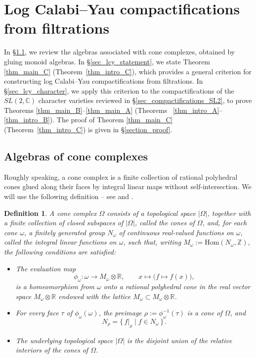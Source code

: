 \documentclass[12pt,letterpaper, reqno]{amsart}
\theoremstyle{defstyle} \newtheorem{definition}[theorem]{Definition}
\theoremstyle{remark}
\numberwithin{equation}{section}
\numberwithin{figure}{section}
\newcommand{\CC} {\mathbb{C}}
\newcommand{\Hom} {\mathrm{Hom}}
\newcommand{\RR} {\mathbb{R}}
\newcommand{\ZZ} {\mathbb{Z}}
\begin{document}
\section{Log Calabi--Yau compactifications from filtrations}
\label{sec_log_cy}

In \S\ref{sec_algebras_cone}, we review the algebras associated with cone complexes, 
obtained by gluing monoid algebras. In \S\ref{sec_lcy_statement}, we state Theorem \ref{thm_main_C} (Theorem~\ref{thm_intro_C}), which provides a general criterion for constructing log Calabi--Yau compactifications from filtrations. In \S\ref{sec_lcy_character}, we apply this criterion to the compactifications of the $SL(2,\CC)$ character varieties reviewed in \S\ref{sec_compactifications_SL2}, to prove Theorems
\ref{thm_main_B}--\ref{thm_main_A} (Theorems ~\ref{thm_intro_A}--\ref{thm_intro_B}). 
The proof of Theorem \ref{thm_main_C} (Theorem~\ref{thm_intro_C}) is given in \S\ref{section_proof}.

\subsection{Algebras of cone complexes}
\label{sec_algebras_cone}


Roughly speaking, a cone complex is a finite collection of rational polyhedral cones glued along their faces by integral linear maps without self-intersection. We will use the following definition -- see  \cite[II1, Definition 5, p69]{KKFMSD} and \cite[Definition 2.1]{payne2009toric}. 




\begin{definition}
A \emph{cone complex} $\Omega$ consists of a topological space $|\Omega|$, together with a finite collection of closed subspaces of $|\Omega|$, called the \emph{cones} of $\Omega$, and, for each cone $\omega$, a finitely generated group $N_\omega$ of continuous real-valued functions on $\omega$, called the \emph{integral linear functions} on $\omega$, such that, writing
$ M_\omega:=\Hom(N_\omega,\ZZ)$, 
the following conditions are satisfied:
\begin{itemize}
    \item[(i)] The evaluation map
    \[
    \phi_\omega:\omega \longrightarrow M_\omega \otimes \RR,
    \qquad
    x\longmapsto \bigl(f\mapsto f(x)\bigr),
    \]
    is a homeomorphism from $\omega$ onto a rational polyhedral cone in the real vector space $M_\omega \otimes \RR$ endowed with the lattice $M_\omega \subset M_\omega \otimes\RR$.
    \item[(ii)] For every face $\tau$ of $\phi_\omega(\omega)$, the preimage
$\rho:=\phi_\omega^{-1}(\tau)$
    is a cone of $\Omega$, and
\[ N_\rho=\{\,f|_\rho \mid f\in N_\omega\,\}\,.\]
    \item[(iii)] The underlying topological space $|\Omega|$ is the disjoint union of the relative interiors of the cones of $\Omega$.
\end{itemize}
\end{definition}
\end{document}
